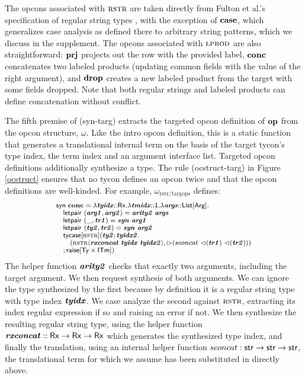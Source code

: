 \documentclass[10pt,preprint]{sigplanconf}
\begin{document}
The opcons associated with $\textsc{rstr}$ are taken directly from Fulton et al.'s specification of regular string types \cite{sanitation-psp14}, with the exception of $\textbf{case}$, which generalizes case analysis as defined there to arbitrary string patterns, which we discuss in the supplement. The opcons associated with $\textsc{lprod}$ are also straightforward: $\textbf{prj}$ projects out the row with the provided label, $\textbf{conc}$ concatenates two labeled products (updating common fields with the value of the right argument), and $\textbf{drop}$ creates a new labeled product from the target with some fields dropped. Note that both regular strings and labeled products can define concatenation without conflict. %

The fifth premise of (syn-targ) extracts the targeted opcon definition of $\textbf{op}$ from the opcon structure, $\omega$. Like the intro opcon definition, this is a static function that generates a translational internal term on the basis of the target tycon's type index, the term index and an argument interface list. Targeted opcon definitions additionally synthesize a type. The rule (ocstruct-targ) in Figure \ref{ocstruct} ensures that no tycon defines an opcon twice and that the opcon definitions are well-kinded. 
For example, $\omega_\text{rstr/targops}$ defines:
\[\small
\begin{array}{l}
\keyw{syn}~\opname{conc}=\slam{\krx}{\svar{tyidx}}{
    \slam{\kunit}{\svar{tmidx}}{
        \slam{\kargs}{\svar{args}}{\\
            \quad \keyw{letpair}~(\svar{arg1}, \svar{arg2}) = \svar{arity2}~\svar{args}\\
            \quad \keyw{letpair}~(\_, \svar{tr1}) = \svar{syn}~\svar{arg1}\\
            \quad \keyw{letpair}~(\svar{ty2}, \svar{tr2}) = \svar{syn}~\svar{arg2}\\
            \quad \stycase{\tcvar{rstr}}{\svar{ty2}}{\svar{tyidx2}}{\\
                \quad\quad (\sty{\tcvar{rstr}}{\svar{rxconcat}~\svar{tyidx}~\svar{tyidx2}}, \sqitm{sconcat~\quq{\svar{tr1}}~\quq{\svar{tr2}}})\\
                \quad
            }{\sraise{\kty\times\kitm}}
        }
    }
}
\end{array}
\]
The helper function ${\textbf{\textit{arity2}}}$ checks that exactly two arguments, including the target argument. We then request synthesis of both arguments. We can ignore the type synthesized by the first because by definition it is a regular string type with type index ${\textbf{\textit{tyidx}}}$. We case analyze the second against $\textsc{rstr}$, extracting its index regular expression if so and raising an error if not. We then synthesize the resulting regular string type, using the helper function ${\textbf{\textit{rxconcat}}} :: {\sf Rx} \rightarrow {\sf Rx} \rightarrow {\sf Rx}$ which generates the synthesized type index, and finally the translation, using an internal helper function $sconcat : {\sf str} \rightarrow {\sf str} \rightarrow {\sf str}$, the translational term for which we assume has been substituted in directly above.
\end{document}
